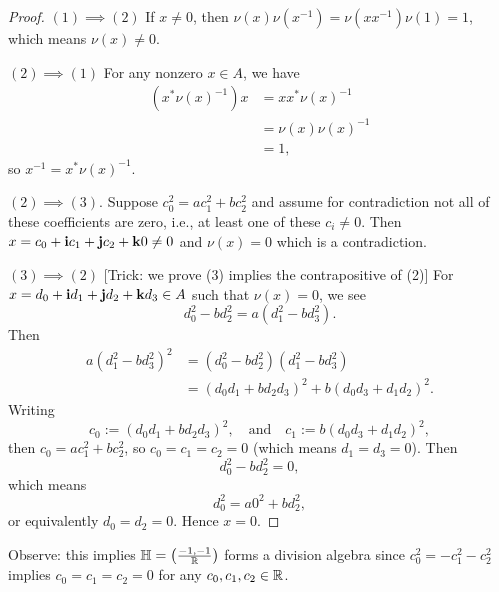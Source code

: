 \begin{proof}
$(1)\implies(2)$ If $x\neq0$, then
  $\nu(x)\nu(x^{-1})=\nu(xx^{-1})\nu(1)=1$, which means $\nu(x)\neq0$.

$(2)\implies(1)$ For any nonzero $x\in A$, we have
\begin{subequations}
  \begin{align}
(x^{*}\nu(x)^{-1})x &= xx^{*}\nu(x)^{-1}\\
    &=\nu(x)\nu(x)^{-1}\\
    &=1,
  \end{align}
\end{subequations}
so $x^{-1}=x^{*}\nu(x)^{-1}$.

$(2)\implies(3)$. Suppose $c_{0}^{2}=ac_{1}^{2}+bc_{2}^{2}$ and
assume for contradiction not all of these coefficients are zero, i.e.,
at least one of these $c_{i}\neq0$. Then
$x=c_{0}+\mathbf{i}c_{1}+\mathbf{j}c_{2}+\mathbf{k}0\neq0$ and
$\nu(x)=0$ which is a contradiction.

$(3)\implies(2)$ [Trick: we prove (3) implies the contrapositive of (2)] For
$x=d_{0}+\mathbf{i}d_{1}+\mathbf{j}d_{2}+\mathbf{k}d_{3}\in A$
such that $\nu(x)=0$, we see
\begin{equation}
d_{0}^{2}-bd_{2}^{2}=a(d_{1}^{2}-bd_{3}^{2}).
\end{equation}
Then
\begin{subequations}
  \begin{align}
a(d_{1}^{2}-bd_{3}^{2})^{2}&=(d_{0}^{2}-bd_{2}^{2})(d_{1}^{2}-bd_{3}^{2})\\
&=(d_{0}d_{1}+bd_{2}d_{3})^{2}+b(d_{0}d_{3}+d_{1}d_{2})^{2}.
  \end{align}
\end{subequations}
Writing
\begin{equation}
c_{0}:=(d_{0}d_{1}+bd_{2}d_{3})^{2},\quad\mbox{and}\quad c_{1}:=b(d_{0}d_{3}+d_{1}d_{2})^{2},
\end{equation}
then $c_{0}=ac_{1}^{2}+bc_{2}^{2}$, so $c_{0}=c_{1}=c_{2}=0$ (which
means $d_{1}=d_{3}=0$). Then
\begin{equation}
d_{0}^{2}-bd_{2}^{2}=0,
\end{equation}
which means
\begin{equation}
d_{0}^{2}=a0^{2}+bd_{2}^{2},
\end{equation}
or equivalently $d_{0}=d_{2}=0$. Hence $x=0$.
\end{proof}

\begin{remark}
Observe: this implies $\mathbb{H}=\left(\frac{-1,-1}{\mathbb{R}}\right)$ forms a
division algebra since $c_{0}^{2}=-c_{1}^{2}-c_{2}^{2}$ implies
$c_{0}=c_{1}=c_{2}=0$ for any $c_{0},c_{1},c_{2}\in\mathbb{R}$.
\end{remark}